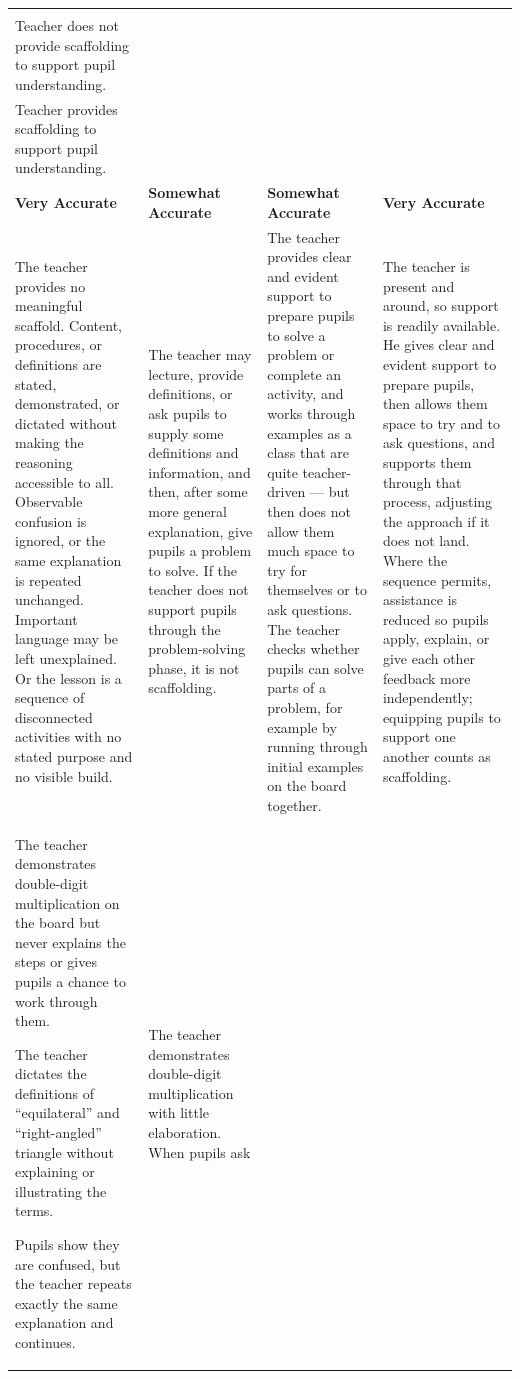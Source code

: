\documentclass[10pt,a4paper]{article}
\makeatletter
\newcommand{\exlistsize}{\scriptsize}
\renewcommand{\arraystretch}{1.25}
\newlength{\gridw}\newlength{\stemw}\newlength{\stemh}\newlength{\stemtop}
\newcommand{\stemrow}[2]{%
  \setlength{\stemtop}{1.15\ht\strutbox}%
  \setlength{\stemw}{0.5\dimexpr\gridw-2\arrayrulewidth\relax}%
  \sbox{\stemAbox}{\begin{minipage}[t]{\dimexpr\stemw-4.4mm\relax}\RaggedRight
      \footnotesize\textbf{Column A}\\#1\end{minipage}}%
  \sbox{\stemBbox}{\begin{minipage}[t]{\dimexpr\stemw-4.4mm\relax}\RaggedRight
      \footnotesize\textbf{Column B}\\#2\end{minipage}}%
  \setlength{\stemh}{\dimexpr\ht\stemAbox+\dp\stemAbox\relax}%
  \ifdim\dimexpr\ht\stemBbox+\dp\stemBbox\relax>\stemh
    \setlength{\stemh}{\dimexpr\ht\stemBbox+\dp\stemBbox\relax}\fi
  \setlength{\stemh}{\dimexpr\stemtop+\stemh+2.6mm\relax}%
  \begin{tikzpicture}[inner sep=0pt,outer sep=0pt,baseline=0pt]
    \shade[left color=gradA,middle color=gradM,right color=gradB]
      (0,\stemtop) rectangle (\dimexpr\gridw-2\arrayrulewidth\relax,
                              \dimexpr\stemtop-\stemh\relax);
    \draw[black,line width=\arrayrulewidth]
      (\stemw,\stemtop) -- (\stemw,\dimexpr\stemtop-\stemh\relax);
    \node[anchor=north west] at (2.2mm,\dimexpr\stemtop-1.2mm\relax)
      {\usebox{\stemAbox}};
    \node[anchor=north west] at (\dimexpr\stemw+2.2mm\relax,
                                 \dimexpr\stemtop-1.2mm\relax)
      {\usebox{\stemBbox}};
  \end{tikzpicture}}
\newcommand{\scoregrid}[4]{%
  \setlength{\gridw}{\linewidth}%
  \renewcommand{\arraystretch}{1.06}%
  \noindent\footnotesize
  \begin{tabularx}{\linewidth}{|>{\RaggedRight\arraybackslash}X
                               |>{\RaggedRight\arraybackslash}X
                               |>{\RaggedRight\arraybackslash}X
                               |>{\RaggedRight\arraybackslash}X|}
  \hline
  \multicolumn{4}{|@{}l@{}|}{\stemrow{#1}{#2}}\\
  \hline
  \rowcolor{tsub}
  \centering\arraybackslash\textbf{Very Accurate} &
  \centering\arraybackslash\textbf{Somewhat Accurate} &
  \centering\arraybackslash\textbf{Somewhat Accurate} &
  \centering\arraybackslash\textbf{Very Accurate}\\
  \hline
  #3\\
  \hline
  \rowcolor{texfill} #4\\
  \hline
  \end{tabularx}\normalsize}
\makeatother
\begin{document}
\scoregrid{Teacher does not provide scaffolding to support pupil understanding.}%
          {Teacher provides scaffolding to support pupil understanding.}{%
\footnotesize The teacher provides no meaningful scaffold. Content, procedures, or definitions are stated,
demonstrated, or dictated without making the reasoning accessible to all. Observable confusion is ignored,
or the same explanation is repeated unchanged. Important language may be left unexplained. Or the lesson is
a sequence of disconnected activities with no stated purpose and no visible build. &
\footnotesize The teacher may lecture, provide definitions, or ask pupils to supply some definitions and
information, and then, after some more general explanation, give pupils a problem to solve. If the teacher
does not support pupils through the problem-solving phase, it is not scaffolding. &
\footnotesize The teacher provides clear and evident support to prepare pupils to solve a problem or
complete an activity, and works through examples as a class that are quite teacher-driven --- but then does
not allow them much space to try for themselves or to ask questions. The teacher checks whether pupils can
solve parts of a problem, for example by running through initial examples on the board together. &
\footnotesize The teacher is present and around, so support is readily available. He gives clear and evident
support to prepare pupils, then allows them space to try and to ask questions, and supports them through
that process, adjusting the approach if it does not land. Where the sequence permits, assistance is reduced
so pupils apply, explain, or give each other feedback more independently; equipping pupils to support one
another counts as scaffolding.
}{%
\exlistsize\begin{exlist}
  \item The teacher demonstrates double-digit multiplication on the board but never explains the steps or
        gives pupils a chance to work through them.
  \item The teacher dictates the definitions of ``equilateral'' and ``right-angled'' triangle without
        explaining or illustrating the terms.
  \item Pupils show they are confused, but the teacher repeats exactly the same explanation and continues.
\end{exlist} &
\exlistsize\begin{exlist}
  \item The teacher demonstrates double-digit multiplication with little elaboration. When pupils ask

\end{exlist}}
\end{document}

